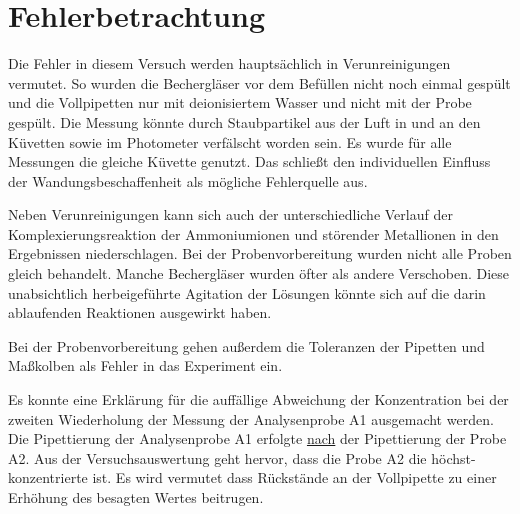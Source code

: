 \section{Fehlerbetrachtung}
\label{sec:fehler}

Die Fehler in diesem Versuch werden hauptsächlich in Verunreinigungen vermutet. So wurden die Bechergläser vor dem Befüllen nicht noch einmal gespült und die Vollpipetten nur mit deionisiertem Wasser und nicht mit der Probe gespült. Die Messung könnte durch Staubpartikel aus der Luft in und an den Küvetten sowie im Photometer verfälscht worden sein. Es wurde für alle Messungen die gleiche Küvette genutzt. Das schließt den individuellen Einfluss der Wandungsbeschaffenheit als mögliche Fehlerquelle aus. 

Neben Verunreinigungen kann sich auch der unterschiedliche Verlauf der Komplexierungsreaktion der Ammoniumionen und störender Metallionen in den Ergebnissen niederschlagen. Bei der Probenvorbereitung wurden nicht alle Proben gleich behandelt. Manche Bechergläser wurden öfter als andere Verschoben. Diese unabsichtlich herbeigeführte Agitation der Lösungen könnte sich auf die darin ablaufenden Reaktionen ausgewirkt haben. 

Bei der Probenvorbereitung gehen außerdem die Toleranzen der Pipetten und Maßkolben als Fehler in das Experiment ein. 

Es konnte eine Erklärung für die auffällige Abweichung der Konzentration bei der zweiten Wiederholung der Messung der Analysenprobe A1 ausgemacht werden. Die Pipettierung der Analysenprobe A1 erfolgte \underline{nach} der Pipettierung der Probe A2. Aus der Versuchsauswertung geht hervor, dass die Probe A2 die höchst-konzentrierte ist. Es wird vermutet dass Rückstände an der Vollpipette zu einer Erhöhung des besagten Wertes beitrugen.
